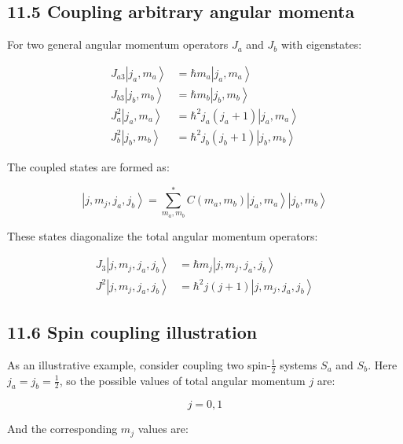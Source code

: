 \documentclass[italian]{HKNdocument}
\begin{document}
\subsection*{11.5 Coupling arbitrary angular momenta}
For two general angular momentum operators $J_{a}$ and $J_{b}$ with eigenstates:

\begin{align*}
J_{a3}\left|j_{a}, m_{a}\right\rangle &= \hbar m_{a}\left|j_{a}, m_{a}\right\rangle \\
J_{b3}\left|j_{b}, m_{b}\right\rangle &= \hbar m_{b}\left|j_{b}, m_{b}\right\rangle \\
J_{a}^{2}\left|j_{a}, m_{a}\right\rangle &= \hbar^2 j_{a}\left(j_{a}+1\right)\left|j_{a}, m_{a}\right\rangle  \tag{11.53}\\
J_{b}^{2}\left|j_{b}, m_{b}\right\rangle &= \hbar^{2} j_{b}\left(j_{b}+1\right)\left|j_{b}, m_{b}\right\rangle
\end{align*}

The coupled states are formed as:

\begin{equation*}
\left|j, m_{j}, j_{a}, j_{b}\right\rangle=\sum_{m_{a}, m_{b}}^{*} C\left(m_{a}, m_{b}\right)\left|j_{a}, m_{a}\right\rangle\left|j_{b}, m_{b}\right\rangle \tag{11.54}
\end{equation*}

These states diagonalize the total angular momentum operators:

\begin{align*}
J_{3}\left|j, m_{j}, j_{a}, j_{b}\right\rangle &= \hbar m_{j}\left|j, m_{j}, j_{a}, j_{b}\right\rangle \\
J^{2}\left|j, m_{j}, j_{a}, j_{b}\right\rangle &= \hbar^2 j(j+1)\left|j, m_{j}, j_{a}, j_{b}\right\rangle \tag{11.55}
\end{align*}

\subsection*{11.6 Spin coupling illustration}
As an illustrative example, consider coupling two spin-$\frac{1}{2}$ systems $S_{a}$ and $S_{b}$. Here $j_{a}=j_{b}=\frac{1}{2}$, so the possible values of total angular momentum $j$ are:

\begin{equation*}
j=0,1 \tag{11.56}
\end{equation*}

And the corresponding $m_j$ values are:
\end{document}

